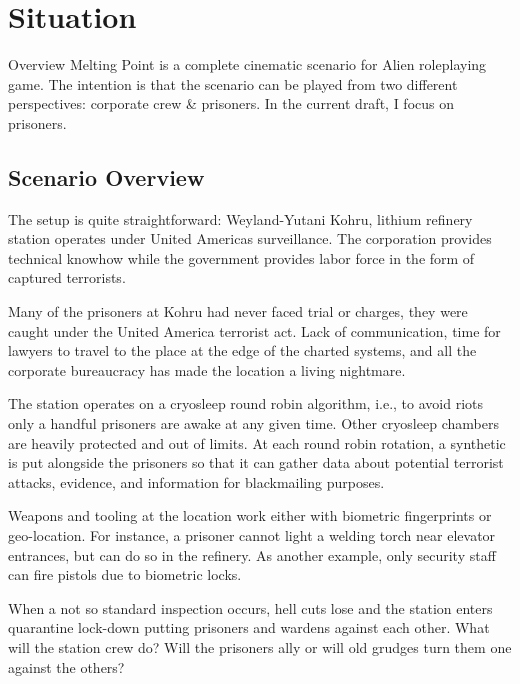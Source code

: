 \chapter{Situation}

\begin{rpg-commentbox}{Overview}
    Melting Point is a complete cinematic scenario for Alien roleplaying game. The intention is that the scenario can be played from two different perspectives: corporate crew \& prisoners. In the current draft, I focus on prisoners.
\end{rpg-commentbox}


\section{Scenario Overview}

The setup is quite straightforward: Weyland-Yutani Kohru, lithium refinery station operates under United Americas surveillance. 
The corporation provides technical knowhow while the government provides labor force in the form of captured terrorists. 

Many of the prisoners at Kohru had never faced trial or charges, they were caught under the United America terrorist act. Lack of communication, time for lawyers to travel to the place at the edge of the charted systems, and all the corporate bureaucracy has made the location a living nightmare.  



The station operates on a cryosleep round robin algorithm, i.e., to avoid riots only a handful prisoners are awake at any given time. Other cryosleep chambers are heavily protected and out of limits. At each round robin rotation, a synthetic is put alongside the prisoners so that it can gather data about potential terrorist attacks, evidence, and information for blackmailing purposes.


Weapons and tooling at the location work either with biometric fingerprints or geo-location. For instance, a prisoner cannot light a welding torch near elevator entrances, but can do so in the refinery. As another example, only security staff can fire pistols due to biometric locks.


When a not so standard inspection occurs, hell cuts lose and the station enters quarantine lock-down putting prisoners and wardens against each other.
What will the station crew do? Will the prisoners ally or will old grudges turn them one against the others? 





